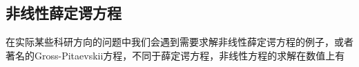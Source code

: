 
\subsection{非线性薛定谔方程}
在实际某些科研方向的问题中我们会遇到需要求解非线性薛定谔方程的例子，或者著名的Gross-Pitaevskii方程，不同于薛定谔方程，非线性方程的求解在数值上有